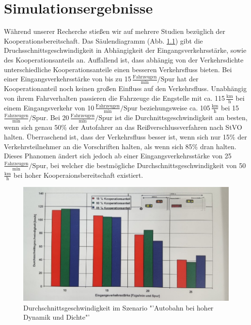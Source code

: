 \chapter{Simulationsergebnisse}
Während unserer Recherche stießen wir auf mehrere Studien \cite[S.129]{Benmimoun.2004} bezüglich der Kooperationsbereitschaft. Das Säulendiagramm (Abb. \ref{fig:kooperation}) gibt die Druchsschnittsgeschwindigkeit in Abhängigkeit der Eingangsverkehrsstärke, sowie des Kooperationsanteils an. Auffallend ist, dass abhängig von der Verkehrsdichte unterschiedliche Kooperationsanteile einen besseren Verkehrsfluss bieten. Bei einer Eingangsverkehrsstärke von bis zu 15\,$\frac{\text{Fahrzeugen}}{\text{min}}/\text{Spur}$ hat der Kooperationanteil noch keinen großen Einfluss auf den Verkehrsfluss. Unabhängig von ihrem Fahrverhalten passieren die Fahrzeuge die Engstelle mit ca. 115\,$\frac{\text{km}}{\text{h}}$ bei einem Eingangsverkehr von 10\,$\frac{\text{Fahrzeugen}}{\text{min}}/\text{Spur}$ beziehungsweise ca. 105\,$\frac{\text{km}}{\text{h}}$ bei 15\,$\frac{\text{Fahrzeugen}}{\text{min}}/\text{Spur}$.
Bei 20\,$\frac{\text{Fahrzeugen}}{\text{min}}/\text{Spur}$ ist die Durchnittsgeschwindigkeit am besten, wenn sich genau 50\% der Autofahrer an das Reißverschlussverfahren nach StVO halten. Überraschend ist, dass der Verkehrsfluss besser ist, wenn sich nur 15\% der Verkehrsteilnehmer an die Vorschriften halten, als wenn sich 85\% dran halten. Dieses Phanomen ändert sich jedoch ab einer Eingangsverkehrsstärke von 25\,$\frac{\text{Fahrzeugen}}{\text{min}}/\text{Spur}$, bei welcher die bestmögliche Durchschnittsgeschwindigkeit von 50\,$\frac{\text{km}}{\text{h}}$ bei hoher Kooperaionsbereitschaft existiert.\\
\begin{figure}
	\centering
	\includegraphics[width=0.6\linewidth]{images/Kooperation}
	\caption{Durchschnittsgeschwindigkeit im Szenario "'Autobahn bei hoher Dynamik und Dichte"'}
	\label{fig:kooperation}
\end{figure}
